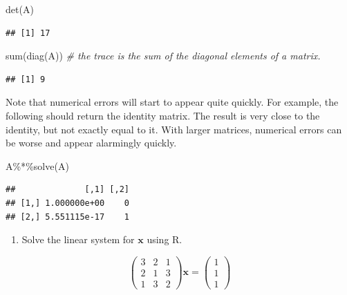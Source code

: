 \documentclass[
]{book}
\newenvironment{Shaded}{\begin{snugshade}}{\end{snugshade}}
\newcommand{\CommentTok}[1]{\textcolor[rgb]{0.56,0.35,0.01}{\textit{#1}}}
\newcommand{\FunctionTok}[1]{\textcolor[rgb]{0.00,0.00,0.00}{#1}}
\newcommand{\NormalTok}[1]{#1}
\newcommand{\SpecialCharTok}[1]{\textcolor[rgb]{0.00,0.00,0.00}{#1}}
\providecommand{\tightlist}{%
  \setlength{\itemsep}{0pt}\setlength{\parskip}{0pt}}
\theoremstyle{definition}
\theoremstyle{definition}
\theoremstyle{definition}
\theoremstyle{definition}
\theoremstyle{remark}
\begin{document}
\begin{Shaded}
\begin{Highlighting}[]
\FunctionTok{det}\NormalTok{(A)}
\end{Highlighting}
\end{Shaded}

\begin{verbatim}
## [1] 17
\end{verbatim}

\begin{Shaded}
\begin{Highlighting}[]
\FunctionTok{sum}\NormalTok{(}\FunctionTok{diag}\NormalTok{(A)) }\CommentTok{\# the trace is the sum of the diagonal elements of a matrix.}
\end{Highlighting}
\end{Shaded}

\begin{verbatim}
## [1] 9
\end{verbatim}

Note that numerical errors will start to appear quite quickly. For example, the following should return the identity matrix. The result is very close to the identity, but not exactly equal to it. With larger matrices, numerical errors can be worse and appear alarmingly quickly.

\begin{Shaded}
\begin{Highlighting}[]
\NormalTok{A}\SpecialCharTok{\%*\%}\FunctionTok{solve}\NormalTok{(A)}
\end{Highlighting}
\end{Shaded}

\begin{verbatim}
##              [,1] [,2]
## [1,] 1.000000e+00    0
## [2,] 5.551115e-17    1
\end{verbatim}

\begin{enumerate}
\def\labelenumi{\arabic{enumi}.}
\tightlist
\item
  Solve the linear system for \(\mathbf x\) using R.
\end{enumerate}

\[\left(\begin{array}{ccc} 3&2&1\\2&1&3\\ 1&3&2\end{array}\right) \mathbf x=\left(\begin{array}{c} 1\\1\\ 1\end{array}\right)\]
\end{document}
